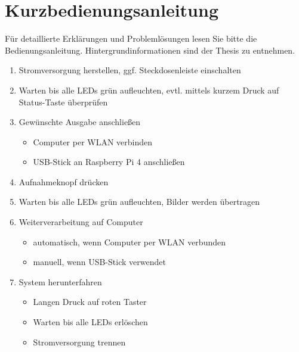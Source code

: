 \documentclass[./00PhotoBox.tex]{subfiles}
\begin{document}
\chapter{Kurzbedienungsanleitung}

Für detaillierte Erklärungen und Problemlösungen lesen Sie bitte die Bedienungsanleitung. Hintergrundinformationen sind der Thesis zu entnehmen.


\begin{enumerate}
    \item Stromversorgung herstellen, ggf. Steckdosenleiste einschalten
    \item Warten bis alle LEDs grün aufleuchten, evtl. mittels kurzem Druck auf Status-Taste überprüfen
    \item Gewünschte Ausgabe anschließen
          \begin{itemize}
              \item Computer per WLAN verbinden
              \item USB-Stick an Raspberry Pi 4 anschließen
          \end{itemize}
    \item Aufnahmeknopf drücken
    \item Warten bis alle LEDs grün aufleuchten, Bilder werden übertragen
    \item Weiterverarbeitung auf Computer
          \begin{itemize}
              \item automatisch, wenn Computer per WLAN verbunden
              \item manuell, wenn USB-Stick verwendet
          \end{itemize}
    \item System herunterfahren
          \begin{itemize}
              \item Langen Druck auf roten Taster
              \item Warten bis alle LEDs erlöschen
              \item Stromversorgung trennen
          \end{itemize}
\end{enumerate}
\end{document}
